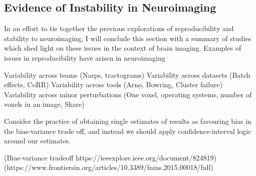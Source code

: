 \subsection{Evidence of Instability in Neuroimaging}
In an effort to tie together the previous explorations of reproducibility and stability to neuroimaging, I will
conclude this section with a summary of studies which shed light on these issues in the context of brain imaging.
Examples of issues in reproducibility have arisen in neuroimaging 

Variability across teams (Narps, tractograms)
Variability across datasets (Batch effects, CoRR)
Variability across tools (Arno, Bowring, Cluster failure)
Variability across minor perturbations (One voxel, operating systems, number of voxels in an image, Skare)

Consider the practice of obtaining single estimates of results as favouring bias in the bias-variance trade off, and
instead we should apply confidence-interval logic around our estimates.

(Bias-variance tradeoff https://ieeexplore.ieee.org/document/824819)
(https://www.frontiersin.org/articles/10.3389/fnins.2015.00018/full)

